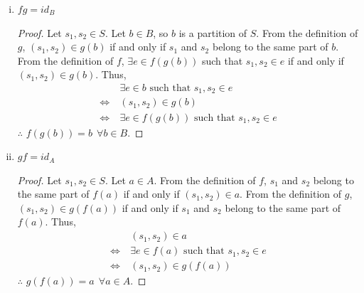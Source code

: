 \documentclass[12pt]{article}
\begin{document}
\begin{enumerate}[(i)]
\begin{proof}
\begin{enumerate}[(a)]
                        \item $s_1, s_2 \in e_1$ and $s_2, s_3 \in e_2$ for some $e_1, e_2 \in b$,
                              $s_2 \in e_1 \cap e_2$, which implies that $e_1 = e_2$. Hence, If
                              $(s_1, s_2) \in g(b)$ and $(s_2, s_3) \in g(b)$, $(s_1, s_3) \in g(b)$.
                              $\therefore$ $g(b)$ is transitive.
                  \end{enumerate}
                  $g(b)$ is reflexive, symmetric, and transitive, which implies $g(b)$ is an equivalence
                  relation.
            \end{proof}
      \item $fg = id_B$
            \begin{proof}
                  Let $s_1, s_2 \in S$. Let $b \in B$, so $b$ is a partition of $S$. From the definition of $g$,
                  $(s_1, s_2) \in g(b)$ if and only if $s_1$ and $s_2$ belong to the same part of
                  $b$. From the definition of $f$, $\exists e \in f(g(b))$ such that $s_1, s_2 \in e$
                  if and only if $(s_1, s_2) \in g(b)$. Thus,
                  \begin{align*}
                                               & \exists e\in b \text{ such that } s_1, s_2 \in e       \\
                        \Longleftrightarrow \  & (s_1, s_2) \in g(b)                                    \\
                        \Longleftrightarrow \  & \exists e\in f(g(b)) \text{ such that } s_1, s_2 \in e
                  \end{align*}
                  $\therefore$ $f(g(b)) = b \ \ \forall b \in B$.
            \end{proof}
      \item $gf = id_A$
            \begin{proof}
                  Let $s_1, s_2 \in S$. Let $a \in A$. From the definition of $f$, $s_1$ and $s_2$ belong
                  to the same part of $f(a)$ if and only if $(s_1, s_2) \in a$. From the definition of $g$,
                  $(s_1, s_2) \in g(f(a))$ if and only if $s_1$ and $s_2$ belong to the same part of $f(a)$.
                  Thus,
                  \begin{align*}
                                               & (s_1, s_2) \in a                                    \\
                        \Longleftrightarrow \  & \exists e\in f(a) \text{ such that } s_1, s_2 \in e \\
                        \Longleftrightarrow \  & (s_1, s_2) \in g(f(a))
                  \end{align*}
                  $\therefore$ $g(f(a)) = a\ \ \forall a \in A$.
            \end{proof}
\end{enumerate}
\end{document}
